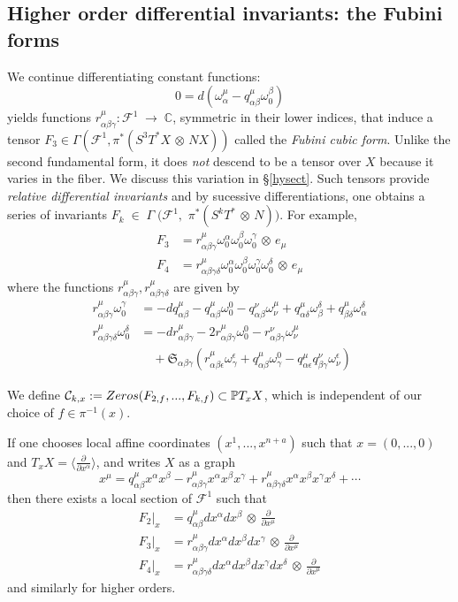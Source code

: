 \documentclass[11pt]{amsart}
\theoremstyle{definition}
\theoremstyle{remark}
\numberwithin{equation}{section}
\def\frp#1{\frac{\partial}{\partial{#1}}}
\def\xx#1{x^{#1}}
\def\ooo#1#2{\omega^{#1}_{#2}}\def\xxx#1#2{x^{#1}_{#2}}
\def\oo#1{\omega^{#1}_0}
\def\ep{\epsilon}
\def\qq#1#2#3{q^{#1}_{{#2} {#3}}}
\def\rr#1#2#3#4{r^{#1}_{{#2} {#3}{#4}}}
\def\rrr#1#2#3#4#5{r^{#1}_{{#2} {#3}{#4}{#5}}}
\def\ee#1{e_{#1}}
\def\cf{\mathcal F}
\def\BC{\mathbb C}\def\BF{\mathbb F}\def\BO{\mathbb O}\def\BS{\mathbb S}
\def\BP{\mathbb P}
\def\hd{,...,}
\def\inv{{}^{-1}}
\def\a{\alpha}
\def\b{\beta}
\def\g{\gamma}
\def\d{\delta}
\def\ot{{\mathord{\,\otimes }\,}}
\def\ra{{\mathord{\;\rightarrow\;}}}
\begin{document}
\subsection{Higher order differential invariants: the Fubini   forms}
We   continue differentiating constant functions:
$$
0=d(\ooo\mu\a -\qq\mu\a\b\oo\b)
$$
yields functions $\rr\mu\a\b\g:\cf^1\ra \BC$, symmetric
in their lower indices,  that induce a tensor
$F_3\in \Gamma (\cf^1,\pi^*(S^3T^*X\ot NX))$ called the
{\it Fubini cubic form}. Unlike the second fundamental form,
it does {\it not} descend   to be a tensor over $X$ because
it varies in the fiber. We discuss this variation   in 
\S\ref{hysect}. Such tensors provide {\it relative differential
invariants} and by sucessive differentiations, one
obtains a series of invariants 
$F_k\;\in\; \Gamma\;
(\cf^1,$ $\pi^*(S^kT^*\ot N))$. For example,
$$
\begin{aligned}
F_3&= \rr\mu\alpha\beta\gamma\oo\a\oo\b\oo
\gamma\ot\ee\mu \label{f3coeff}\\
F_4 &=  \rr\mu\alpha\beta{\gamma\delta}  
\oo\a \oo\b \oo\g \oo\delta\ot \ee\mu 
\end{aligned}
$$
where the functions $\rr\mu\alpha\beta\gamma,
\rr\mu\alpha\beta{\gamma\delta} $ are given by 
\begin{align}
\rr\mu\alpha\beta\gamma\oo\gamma 
&=-d\qq\mu\alpha\beta - \qq\mu\alpha\beta\ooo 00 
-\qq\nu\alpha\beta\ooo\mu\nu
+\qq\mu\alpha\delta\ooo\delta\beta +
 \qq\mu\beta\delta\ooo\delta\alpha \label{f3eqn}\\
\rr\mu\alpha\beta{\gamma\delta}\oo\delta  
&=  -d\rr\mu\alpha\beta\gamma -2\rr\mu\alpha\beta\gamma\ooo 00
-\rr\nu\alpha\beta\gamma\ooo\mu\nu \label{f4eqn}\\
&\quad+\mathfrak  S_{\alpha\beta\gamma}(
\rr\mu\alpha\beta\epsilon\ooo\epsilon\gamma 
+ \qq\mu\alpha\beta\ooo 0\gamma
-\qq\mu\alpha\epsilon\qq\nu\beta\gamma\ooo\epsilon\nu )\nonumber
\end{align}

We define $\cC_{k,x}:=Zeros(F_{2,f}\hd F_{k,f})\subset \BP T_xX$,
which is independent of our choice of $f\in \pi\inv(x)$.

 
If one chooses local affine coordinates $(\xx 1\hd \xx{n+a})$
such that $x=(0\hd 0)$ and $T_xX=\langle \frac\partial{\partial\xx\a}\rangle$, and writes $X$ as a graph
$$
\xx\mu = \qq\mu\a\b\xx\a\xx\b - \rr\mu\a\b\g\xx\a\xx\b\xx\g
+\rrr\mu\a\b\g\delta \xx\a\xx\b\xx\g\xx\delta + \cdots
$$
then there exists a  local section of $\cf^1$
such that 
$$
\begin{aligned}
F_2|_x&=\qq\mu\a\b d\xx\a d\xx\b\ot\frp{\xx\mu}\\
F_3|_x&=\rr\mu\a\b\g d\xx\a d\xx\b d\xx\g\ot\frp{\xx\mu}\\
F_4|_x&=\rrr\mu\a\b\g\delta d\xx\a d\xx\b d\xx\g 
d\xx\delta\ot\frp{\xx\mu}
\end{aligned}
$$
and similarly for higher orders.
\end{document}
